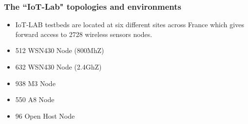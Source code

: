 \documentclass{beamer}
\begin{document}

\begin{frame}
	\frametitle{The ``IoT-Lab" topologies and environments}
	\vspace{.1cm}
	\begin{itemize}
		\item IoT-LAB testbeds are located at six different sites across France which 
		gives forward access to \textcolor{TextOrange}{2728 wireless sensors nodes}.
	\end{itemize}
	\vspace{.5cm}
	\begin{itemize}
		\item 512 WSN430 Node (800MhZ)
		\item 632 WSN430 Node (2.4GhZ)
		\item 938 M3 Node
		\item 550 A8 Node
		\item 96 Open Host Node		
	\end{itemize}
\end{frame}
\end{document}
